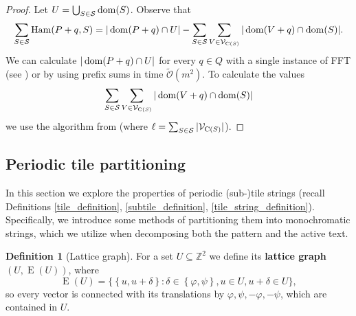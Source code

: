 \documentclass[11pt, letterpaper]{article}
\theoremstyle{plain}
\theoremstyle{definition}
\newtheorem{definition}{Definition}
\theoremstyle{remark}
\newcommand{\Z}{\mathbb{Z}}
\newcommand{\tO}{\tilde{\mathcal{O}}}
\renewcommand{\S}{\mathcal{S}}
\newcommand{\V}{\mathcal{V}}
\renewcommand{\phi}{\varphi}
\newcommand{\set}[1]{\left\lbrace #1 \right\rbrace}
\newcommand{\bigset}[1]{\big \lbrace #1 \big \rbrace}
\DeclareMathOperator*{\Edges}{E}
\DeclareMathOperator*{\Ham}{Ham}
\begin{document}
\SparseAlgo
\begin{proof}
	Let $U = \bigcup_{S \in \S} \d{S}$. Observe that
	\[ \sum_{S \in \S} \Ham(P + q, S) = |\d{P + q} \cap U| - \sum_{S \in \S}\sum_{V \in \V_{\getchar{S}}} |\d{V + q} \cap \d{S}|.\]
	We can calculate $|\operatorname*{dom}(P + q) \cap U|$ for every $q \in Q$ with a single instance of FFT (see ) or by using prefix sums in time $\tO(m^2)$.
	To calculate the values
	\[ \sum_{S \in \S}\sum_{V \in \V_{\getchar{S}}} |\d{V + q} \cap \d{S}| \]
	we use the algorithm from  (where $\ell = \sum_{S \in \S} |\V_{\getchar{S}}|$).
\end{proof}


\subsection{Periodic tile partitioning} \label{tile_decomposition_proof}
In this section we explore the properties of periodic (sub-)tile strings (recall Definitions \ref{tile_definition}, \ref{subtile_definition}, \ref{tile_string_definition}).
Specifically, we introduce some methods of partitioning them into monochromatic strings, which we utilize when decomposing both the pattern and the active text.

\begin{definition}[Lattice graph]
	For a set $U \subseteq \Z^2$ we define its \textbf{lattice graph} $(U, \Edges(U))$, where
	\[ \Edges(U) = \bigset{\set{u, u + \delta} : \delta \in \set{\phi, \psi}, u \in U, u + \delta \in U},\] 
	so every vector is connected with its translations by $\phi, \psi, -\phi, -\psi$, which are contained in $U$.
\end{definition}
\end{document}
